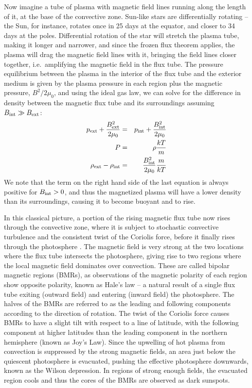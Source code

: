 Now imagine a tube of plasma with magnetic field lines running along the length of it, at the base of the convective zone. Sun-like stars are differentially rotating -- the Sun, for instance, rotates once in 25 days at the equator, and closer to 34 days at the poles. Differential rotation of the star will stretch the plasma tube, making it longer and narrower, and since the frozen flux theorem applies, the plasma will drag the magnetic field lines with it, bringing the field lines closer together, i.e.\ amplifying the magnetic field in the flux tube. The pressure equilibrium between the plasma in the interior of the flux tube and the exterior medium is given by the plasma pressure in each region plus the magnetic pressure, $B^2/2\mu_0$, and using the ideal gas law, we can solve for the difference in density between the magnetic flux tube and its surroundings assuming $B_{\rm int} \gg B_{\rm ext}$:
\begin{eqnarray}
p_{\rm ext} + \frac{B_{\rm ext}^2}{2\mu_0} &=& p_{\rm int} + \frac{B_{\rm int}^2}{2\mu_0}\\
P &=& \rho \frac{kT}{m} \\
\rho_{\rm ext} - \rho_{\rm int} &=& \frac{B_{\rm int}^2}{2\mu_0} \frac{m}{kT}
\end{eqnarray}
We note that the term on the right hand side of the last equation is always positive for $B_{\rm int} > 0$, and thus the magnetized plasma will have a lower density than its surroundings, causing it to become buoyant and to rise. 

In this classical picture, a portion of the rising magnetic flux tube now rises through the convective zone, where it is subject to stochastic convective turbulence and the consistent twist of the Coriolis force, before it finally rises through the photosphere \citep{Rempel2011, Cheung2014}. The magnetic field is very strong at the two locations where the flux tube intersects the photosphere, giving rise to two regions where the local magnetic field dominates over convection. These are called bipolar magnetic regions (BMRs), as observations of the magnetic polarity of each region show opposite polarity, known as Hale's law -- a natural result of a single flux tube exiting (outward field) and entering (inward field) the photosphere. The halves of the BMRs are referred to as the leading and following components according to the direction of rotation. The twist of the Coriolis force causes BMRs to have a slight tilt with respect to a line of latitude, with the following component at higher latitudes than the leading component in the northern hemisphere (known as Joy's Law). Since the upwelling of hot plasma from convection is suppressed by the strong magnetic fields, an area just below the quiescent photosphere is evacuated, pushing the effective photosphere downwards, known as the Wilson depression. In regions of strong enough fields, the evacuated region cools and thus the cores of the BMRs are observed as dark sunspots. 

